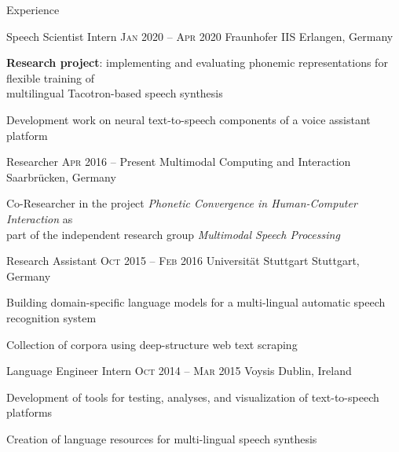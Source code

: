 \documentclass{resume} %
\begin{document}
\begin{rSection}{Experience}

\begin{rSubsection}
	{Speech Scientist Intern}
	{\textsc{Jan} 2020 -- \textsc{Apr} 2020}
	{Fraunhofer IIS}
	{Erlangen, Germany}
	
	\setlength{\itemindent}{.7cm}
	
	\item \textbf{Research project}: implementing and evaluating phonemic representations for flexible training of\\\hspace*{.6cm} multilingual Tacotron-based speech synthesis
	\item Development work on neural text-to-speech components of a voice assistant platform
\end{rSubsection}

\begin{rSubsection}
	{Researcher}
	{\textsc{Apr} 2016 -- Present}
	{Multimodal Computing and Interaction}
	{Saarbrücken, Germany}
	
	\setlength{\itemindent}{.7cm}
	
	\item Co-Researcher in the project \textit{Phonetic Convergence in Human-Computer Interaction} as\\\hspace*{.7cm}part of the independent research group \textit{Multimodal Speech Processing}
\end{rSubsection}

\begin{rSubsection}
	{Research Assistant}
	{\textsc{Oct} 2015 -- \textsc{Feb} 2016}
	{Universität Stuttgart}
	{Stuttgart, Germany}
	
	\setlength{\itemindent}{.7cm}
	
	\item Building domain-specific language models for a multi-lingual automatic speech recognition system
	\item Collection of corpora using deep-structure web text scraping
\end{rSubsection}

\begin{rSubsection}
	{Language Engineer Intern}
	{\textsc{Oct} 2014 -- \textsc{Mar} 2015}
	{Voysis}
	{Dublin, Ireland}
	
	\setlength{\itemindent}{.7cm}

	\item Development of tools for testing, analyses, and visualization of text-to-speech platforms
	\item Creation of language resources for multi-lingual speech synthesis
\end{rSubsection}


\end{rSection}
\end{document}
